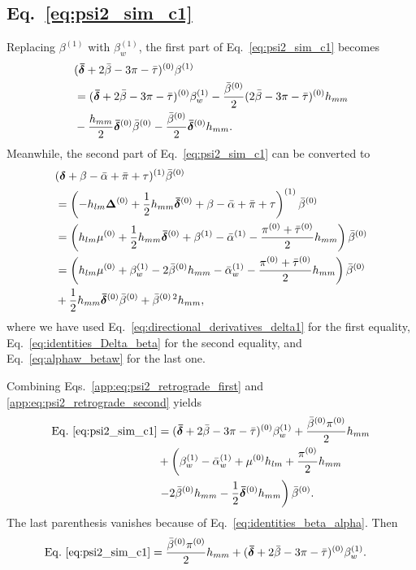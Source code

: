 \documentclass[aps,prd,amsmath,floats,floatfix, twocolumn,
superscriptaddress,nofootinbib,showpacs]{revtex4-1}
\begin{document}
\subsection{\texorpdfstring{Eq.~\eqref{eq:psi2_sim_c1}}{Derivation of Equationc1}}
Replacing $\beta^{(1)}$ with $\beta_w^{(1)}$, the first part of Eq.~\eqref{eq:psi2_sim_c1} becomes
\begin{align}
    &(\bm{\bar{\delta}}+2\bar{\beta}-3\pi-\bar{\tau})^{(0)}\beta^{(1)} \notag \\
    &=(\bm{\bar{\delta}}+2\bar{\beta}-3\pi-\bar{\tau})^{(0)}\beta_w^{(1)}-\frac{\bar{\beta}^{(0)}}{2}(2\bar{\beta}-3\pi-\bar{\tau})^{(0)}h_{mm} \notag \\
    &
    -\frac{h_{mm}}{2}\bm{\bar{\delta}}^{(0)}\bar{\beta}^{(0)}    -\frac{\bar{\beta}^{(0)}}{2}\bm{\bar{\delta}}^{(0)}h_{mm}. \label{app:eq:psi2_retrograde_first}
\end{align}
Meanwhile, the second part of Eq.~\eqref{eq:psi2_sim_c1} can be converted to
\begin{align}
&(\bm{\delta}+\beta-\bar{\alpha}+\bar{\pi}+\tau)^{(1)}\bar{\beta}^{(0)}  \notag \\
&=\left(-h_{lm}\bm{\Delta}^{(0)}+\frac{1}{2}h_{mm}\bm{\bar{\delta}}^{(0)}+\beta-\bar{\alpha}+\bar{\pi}+\tau\right)^{(1)}\bar{\beta}^{(0)} \notag \\
&=\left(h_{lm}\mu^{(0)}+\frac{1}{2}h_{mm}\bm{\bar{\delta}}^{(0)}+\beta^{(1)}-\bar{\alpha}^{(1)}-\frac{\pi^{(0)}+\bar{\tau}^{(0)}}{2}h_{mm}\right)\bar{\beta}^{(0)} \notag \\
&=\left(h_{lm}\mu^{(0)}+\beta_w^{(1)}-2\bar{\beta}^{(0)}h_{mm}-\bar{\alpha}_w^{(1)}-\frac{\pi^{(0)}+\bar{\tau}^{(0)}}{2}h_{mm}\right)\bar{\beta}^{(0)} \notag \\
&+\frac{1}{2}h_{mm}\bm{\bar{\delta}}^{(0)}\bar{\beta}^{(0)}+\bar{\beta}^{(0)\,2}h_{mm}, \label{app:eq:psi2_retrograde_second}
\end{align}
where we have used Eq.~\eqref{eq:directional_derivatives_delta1} for the first equality, Eq.~\eqref{eq:identities_Delta_beta} for the second equality, and Eq.~\eqref{eq:alphaw_betaw} for the last one.

Combining Eqs.~\eqref{app:eq:psi2_retrograde_first} and \eqref{app:eq:psi2_retrograde_second} yields 
\begin{align}
    {\rm{Eq.~\eqref{eq:psi2_sim_c1}}}&=(\bm{\bar{\delta}}+2\bar{\beta}-3\pi-\bar{\tau})^{(0)}\beta_w^{(1)}+\frac{\bar{\beta}^{(0)}\pi^{(0)}}{2}h_{mm} \notag \\
    &+\left(\beta_w^{(1)}-\bar{\alpha}_w^{(1)}+\mu^{(0)}h_{lm}+\frac{\pi^{(0)}}{2}h_{mm}\right.\notag \\
    &\left.-2\bar{\beta}^{(0)}h_{mm}-\frac{1}{2}\bm{\bar{\delta}}^{(0)}h_{mm}\right)\bar{\beta}^{(0)}.
\end{align}
The last parenthesis vanishes because of Eq.~\eqref{eq:identities_beta_alpha}. Then
\begin{align}
    &{\rm{Eq.~\eqref{eq:psi2_sim_c1}}}=\frac{\bar{\beta}^{(0)}\pi^{(0)}}{2}h_{mm}+(\bm{\bar{\delta}}+2\bar{\beta}-3\pi-\bar{\tau})^{(0)}\beta_w^{(1)}. \label{eq:psi2_sim_c1_final}
\end{align}
\end{document}
